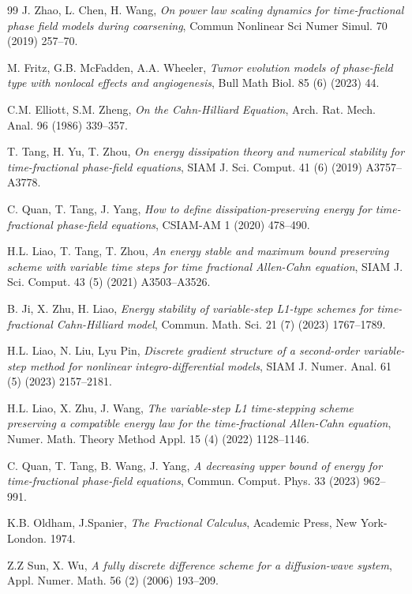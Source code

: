 \documentclass{siamart171218}
\theoremstyle{remark}
\theoremstyle{example}
\numberwithin{equation}{section}
\begin{document}
\begin{thebibliography}{99}
{\sc J. Zhao, L. Chen, H. Wang}, {\em On power law scaling dynamics for time-fractional phase field models during coarsening}, Commun Nonlinear Sci Numer Simul. 70 (2019) 257–70.

{\sc M. Fritz, G.B. McFadden, A.A. Wheeler}, {\em Tumor evolution models of phase-field type with nonlocal effects and angiogenesis}, Bull Math Biol. 85 (6) (2023) 44.

{\sc C.M. Elliott, S.M. Zheng}, {\em On the Cahn-Hilliard Equation}, Arch. Rat. Mech.
Anal. 96 (1986) 339–357.

{\sc T. Tang, H. Yu, T. Zhou}, {\em On energy dissipation theory and numerical stability for time-fractional phase-field equations}, SIAM J. Sci. Comput. 41 (6) (2019) A3757–A3778.

{\sc C. Quan, T. Tang, J. Yang}, \emph{How to define dissipation-preserving energy for time-fractional phase-field equations}, CSIAM-AM 1 (2020) 478–490.

{\sc H.L. Liao, T. Tang, T. Zhou}, {\em An energy stable and maximum bound preserving scheme with variable time steps for time fractional Allen-Cahn equation}, SIAM J. Sci. Comput. 43 (5) (2021) A3503–A3526.

{\sc B. Ji, X. Zhu, H. Liao}, {\em   Energy stability of variable-step L1-type schemes for time-fractional Cahn-Hilliard model}, Commun. Math. Sci. 21 (7) (2023) 1767–1789.

{\sc H.L. Liao, N. Liu, Lyu Pin}, {\em Discrete gradient structure of a second-order variable-step method for nonlinear integro-differential models}, SIAM J. Numer.
Anal. 61 (5) (2023) 2157–2181.

{\sc H.L. Liao, X. Zhu, J. Wang}, {\em The variable-step L1 time-stepping scheme preserving a compatible energy law for the time-fractional Allen-Cahn equation}, Numer. Math. Theory Method Appl. 15 (4) (2022) 1128–1146.

{\sc C. Quan, T. Tang, B. Wang, J. Yang}, \emph{A decreasing upper bound of energy for time-fractional phase-field equations}, Commun. Comput. Phys. 33 (2023) 962–991.

{\sc K.B. Oldham, J.Spanier}, {\em The Fractional Calculus}, Academic Press, New York-London. 1974.

{\sc Z.Z Sun, X. Wu}, \emph{A fully discrete difference scheme for a diffusion-wave system}, Appl. Numer. Math. 56 (2) (2006) 193–209.


\end{thebibliography}
\end{document}
